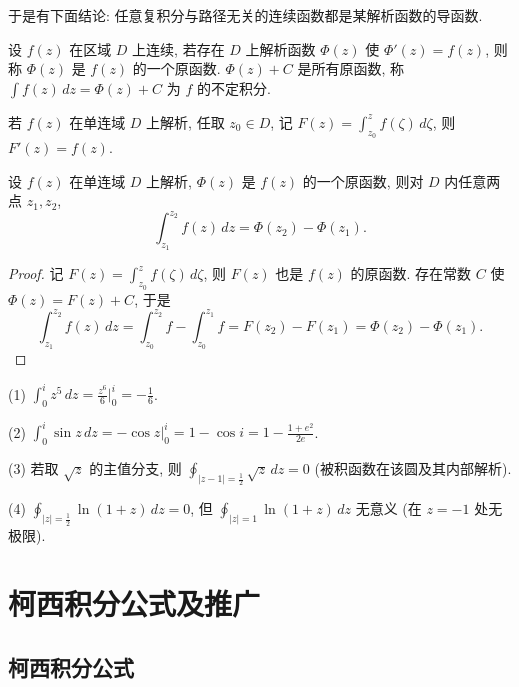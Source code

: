 \documentclass[theorem=false,mathfont=none,openany,sub3section]{easybook}
\begin{document}
于是有下面结论: 任意复积分与路径无关的连续函数都是某解析函数的导函数.

\begin{definition}
  设 $f(z)$ 在区域 $D$ 上连续, 若存在 $D$ 上解析函数 $\Phi(z)$ 使 $\Phi'(z)=f(z)$, 则称 $\Phi(z)$ 是 $f(z)$ 的一个原函数. $\Phi(z)+C$ 是所有原函数, 称 $\int f(z)\,dz=\Phi(z)+C$ 为 $f$ 的不定积分.
\end{definition}

\begin{corollary}
  若 $f(z)$ 在单连域 $D$ 上解析, 任取 $z_{0}\in D$, 记 $F(z)=\int_{z_{0}}^{z}f(\zeta)\,d\zeta$, 则 $F'(z)=f(z)$.
\end{corollary}

\begin{theorem}
  设 $f(z)$ 在单连域 $D$ 上解析, $\Phi(z)$ 是 $f(z)$ 的一个原函数, 则对 $D$ 内任意两点 $z_{1},z_{2}$,
  \[
  \int_{z_{1}}^{z_{2}}f(z)\,dz=\Phi(z_{2})-\Phi(z_{1}).
  \]
\end{theorem}

\begin{proof}
  记 $F(z)=\int_{z_{0}}^{z}f(\zeta)\,d\zeta$, 则 $F(z)$ 也是 $f(z)$ 的原函数.
  存在常数 $C$ 使 $\Phi(z)=F(z)+C$, 于是
  \[
  \int_{z_{1}}^{z_{2}}f(z)\,dz=\int_{z_{0}}^{z_{2}}f-\int_{z_{0}}^{z_{1}}f=F(z_{2})-F(z_{1})=\Phi(z_{2})-\Phi(z_{1}).
  \]
\end{proof}

\begin{example}
  (1) $\int_{0}^{i}z^{5}\,dz=\frac{z^{6}}{6}\big|_{0}^{i}=-\frac{1}{6}$.

  (2) $\int_{0}^{i}\sin z\,dz=-\cos z\big|_{0}^{i}=1-\cos i=1-\frac{1+e^{2}}{2e}$.

  (3) 若取 $\sqrt{z}$ 的主值分支, 则 $\oint_{|z-1|=\frac{1}{2}}\sqrt{z}\,dz=0$ (被积函数在该圆及其内部解析).

  (4) $\oint_{|z|=\frac{1}{2}}\ln(1+z)\,dz=0$, 但 $\oint_{|z|=1}\ln(1+z)\,dz$ 无意义 (在 $z=-1$ 处无极限).
\end{example}

\newpage

\section{柯西积分公式及推广}

\subsection{柯西积分公式}
\end{document}
